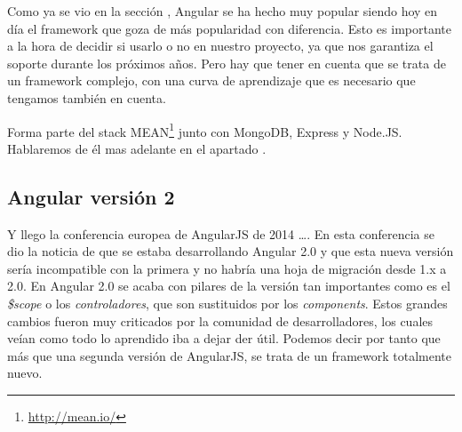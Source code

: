 Como ya se vio en la sección , Angular se ha hecho muy popular siendo hoy en día el framework que goza de más popularidad con diferencia. Esto es importante a la hora de decidir si usarlo o no en nuestro proyecto, ya que nos garantiza el soporte durante los próximos años. Pero hay que tener en cuenta que se trata de un framework complejo, con una curva de aprendizaje que es necesario que tengamos también en cuenta.

Forma parte del stack \gls{MEAN}\footnote{\url{http://mean.io/}} junto con MongoDB, Express y Node.JS. Hablaremos de él mas adelante en el apartado .

\subsection{Angular versión 2}

\cite{SharifAng2} Y llego la conferencia europea de AngularJS de 2014 \ldots. En esta conferencia se dio la noticia de que se estaba desarrollando Angular 2.0 y que esta nueva versión sería incompatible con la primera y no habría una hoja de migración desde 1.x a 2.0. En Angular 2.0 se acaba con pilares de la versión tan importantes como es el \emph{\$scope} o los \emph{controladores}, que son sustituidos por los \emph{components}. Estos grandes cambios fueron muy criticados por la comunidad de desarrolladores, los cuales veían como todo lo aprendido iba a dejar der útil. Podemos decir por tanto que más que una segunda versión de AngularJS, se trata de un framework totalmente nuevo.



